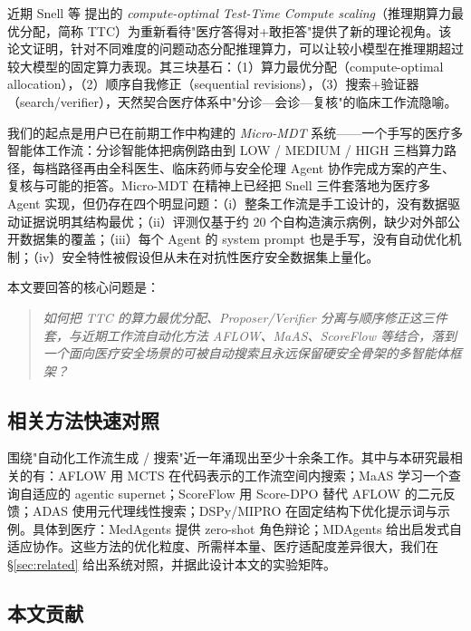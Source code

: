 \documentclass[11pt,a4paper]{ctexart}
\begin{document}
近期 Snell 等 \cite{snell2024scaling} 提出的 \emph{compute-optimal Test-Time Compute scaling}（推理期算力最优分配，简称 TTC）为重新看待"医疗答得对+敢拒答"提供了新的理论视角。该论文证明，针对不同难度的问题动态分配推理算力，可以让较小模型在推理期超过较大模型的固定算力表现。其三块基石：（1）算力最优分配（compute-optimal allocation），（2）顺序自我修正（sequential revisions），（3）搜索+验证器（search/verifier），天然契合医疗体系中"分诊—会诊—复核"的临床工作流隐喻。

我们的起点是用户已在前期工作中构建的 \emph{Micro-MDT} 系统——一个手写的医疗多智能体工作流：分诊智能体把病例路由到 LOW / MEDIUM / HIGH 三档算力路径，每档路径再由全科医生、临床药师与安全伦理 Agent 协作完成方案的产生、复核与可能的拒答。Micro-MDT 在精神上已经把 Snell 三件套落地为医疗多 Agent 实现，但仍存在四个明显问题：（i）整条工作流是手工设计的，没有数据驱动证据说明其结构最优；（ii）评测仅基于约 20 个自构造演示病例，缺少对外部公开数据集的覆盖；（iii）每个 Agent 的 system prompt 也是手写，没有自动优化机制；（iv）安全特性被假设但从未在对抗性医疗安全数据集上量化。

本文要回答的核心问题是：

\begin{quote}
\itshape
如何把 TTC 的算力最优分配、Proposer/Verifier 分离与顺序修正这三件套，与近期工作流自动化方法 AFLOW、MaAS、ScoreFlow 等结合，落到一个面向医疗安全场景的可被自动搜索且永远保留硬安全骨架的多智能体框架？
\end{quote}

\subsection{相关方法快速对照}

围绕"自动化工作流生成 / 搜索"近一年涌现出至少十余条工作。其中与本研究最相关的有：AFLOW \cite{aflow2024} 用 MCTS 在代码表示的工作流空间内搜索；MaAS \cite{maas2025} 学习一个查询自适应的 agentic supernet；ScoreFlow \cite{scoreflow2025} 用 Score-DPO 替代 AFLOW 的二元反馈；ADAS \cite{adas2024} 使用元代理线性搜索；DSPy/MIPRO \cite{dspy2024} 在固定结构下优化提示词与示例。具体到医疗：MedAgents \cite{medagents2024} 提供 zero-shot 角色辩论；MDAgents \cite{mdagents2024} 给出启发式自适应协作。这些方法的优化粒度、所需样本量、医疗适配度差异很大，我们在 \S\ref{sec:related} 给出系统对照，并据此设计本文的实验矩阵。

\subsection{本文贡献}
\end{document}
